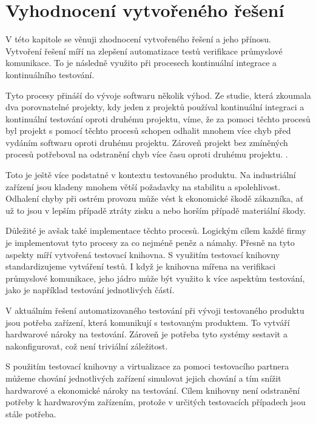 \chapter{Vyhodnocení vytvořeného řešení}\label{chap:evaluation}

V této kapitole se věnuji zhodnocení vytvořeného řešení a jeho přínosu. \\



Vytvoření řešení míří na zlepšení automatizace testů verifikace průmyslové komunikace. To je následně využito při procesech kontinuální integrace a kontinuálního testování. 

Tyto procesy přináší do vývoje softwaru několik výhod. Ze studie, která zkoumala dva porovnatelné projekty, kdy jeden z projektů používal kontinuální integraci a kontinuální testování oproti druhému projektu, víme, že za pomoci těchto procesů byl projekt s pomocí těchto procesů schopen odhalit mnohem více chyb před vydáním softwaru oproti druhému projektu. Zároveň projekt bez zmíněných procesů potřeboval na odstranění chyb více času oproti druhému projektu. \cite{ci_study}. 

Toto je ještě více podstatné v kontextu testovaného produktu. Na industriální zařízení jsou kladeny mnohem větší požadavky na stabilitu a spolehlivost. Odhalení chyby při ostrém provozu může vést k ekonomické škodě zákazníka, ať už to jsou v lepším případě ztráty zisku a nebo horším případě materiální škody.

Důležité je avšak také implementace těchto procesů. Logickým cílem každé firmy je implementovat tyto procesy za co nejméně peněz a námahy. Přesně na tyto aspekty míří vytvořená testovací knihovna. S využitím testovací knihovny standardizujeme vytváření testů. I když je knihovna mířena na verifikaci průmyslové komunikace, jeho jádro může být využito k více aspektům testování, jako je například testování jednotlivých částí. 

V aktuálním řešení automatizovaného testování při vývoji testovaného produktu jsou potřeba zařízení, která komunikují s testovaným produktem. To vytváří hardwarové nároky na testování. Zároveň je potřeba tyto systémy sestavit a nakonfigurovat, což není triviální záležitost. 

S použitím testovací knihovny a virtualizace za pomoci testovacího partnera můžeme chování jednotlivých zařízení simulovat jejich chování a tím snížit hardwarové a ekonomické nároky na testování. Cílem knihovny není odstranění potřeby k hardwarovým zařízením, protože v určitých testovacích případech jsou stále potřeba.


